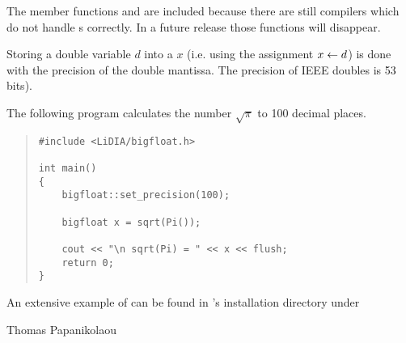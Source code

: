 The member functions  and  are included
because there are still compilers which do not handle s correctly.  In a future
release those functions will disappear.

Storing a double variable $d$ into a  $x$ (i.e. using the assignment $x \leftarrow d$)
is done with the precision of the double mantissa.  The precision of IEEE doubles is 53 bits).



\EXAMPLES

The  following  program  calculates  the number $\sqrt{\pi}$
to 100 decimal places.

\begin{quote}
\begin{verbatim}
#include <LiDIA/bigfloat.h>

int main()
{
    bigfloat::set_precision(100);

    bigfloat x = sqrt(Pi());

    cout << "\n sqrt(Pi) = " << x << flush;
    return 0;
}
\end{verbatim}
\end{quote}

An extensive example of  can be found in \LiDIA's installation directory under



\AUTHOR

Thomas Papanikolaou
